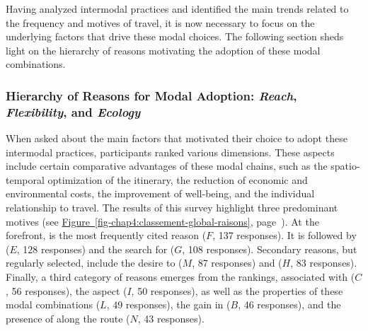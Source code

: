 \begin{refsegment}
Having analyzed intermodal practices and identified the main trends related to the frequency and motives of travel, it is now necessary to focus on the underlying factors that drive these modal choices. The following section sheds light on the hierarchy of reasons motivating the adoption of these modal combinations.%

\subsubsection*{Hierarchy of Reasons for Modal Adoption: \textsl{Reach}, \textsl{Flexibility}, and \textsl{Ecology}
    \label{chap4:raisons-adoption}
    }

When asked about the main factors that motivated their choice to adopt these intermodal practices, participants ranked various dimensions. These aspects include certain comparative advantages of these modal chains, such as the spatio-temporal optimization of the \gls{itinerary}, the reduction of economic and environmental costs, the improvement of well-being, and the individual relationship to travel. The results of this survey highlight three predominant motives (see \hyperref[fig-chap4:classement-global-raisons]{Figure~\ref{fig-chap4:classement-global-raisons}}, page~\pageref{fig-chap4:classement-global-raisons}). At the forefront,  is the most frequently cited reason (\(F\), 137 responses). It is followed by  (\(E\), 128 responses) and the search for  (\(G\), 108 responses). Secondary reasons, but regularly selected, include the desire to  (\(M\), 87 responses) and  (\(H\), 83 responses). Finally, a third category of reasons emerges from the rankings, associated with  (\(C\), 56 responses), the  aspect (\(I\), 50 responses), as well as the  properties of these modal combinations (\(L\), 49 responses), the gain in  (\(B\), 46 responses), and the presence of  along the route (\(N\), 43 responses).%


\end{refsegment}
